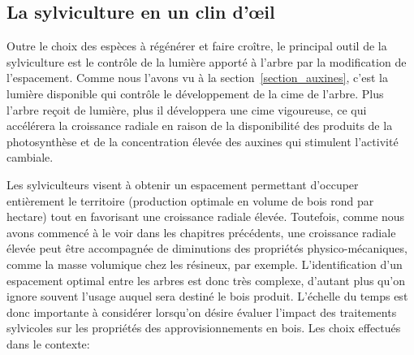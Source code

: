 \subsection{La sylviculture en un clin d'œil}

Outre le choix des espèces à régénérer et faire croître, le principal outil de la sylviculture est le contrôle de la lumière apporté à l'arbre par la modification de l'espacement. Comme nous l'avons vu à la section~\ref{section_auxines}, c'est la lumière disponible qui contrôle le développement de la cime de l'arbre. Plus l'arbre reçoit de lumière, plus il développera une cime vigoureuse, ce qui accélérera la croissance radiale en raison de la disponibilité des produits de la photosynthèse et de la concentration élevée des auxines qui stimulent l'activité cambiale.

Les sylviculteurs visent à obtenir un espacement permettant d'occuper entièrement le territoire (production optimale en volume de bois rond par hectare) tout en favorisant une croissance radiale élevée. Toutefois, comme nous avons commencé à le voir dans les chapitres précédents, une croissance radiale élevée peut être accompagnée de diminutions des propriétés physico-mécaniques, comme la masse volumique chez les résineux, par exemple. L'identification d'un espacement optimal entre les arbres est donc très complexe, d'autant plus qu'on ignore souvent l'usage auquel sera destiné le bois produit. L'échelle du temps est donc importante à considérer lorsqu'on désire évaluer l'impact des traitements sylvicoles sur les propriétés des approvisionnements en bois. Les choix effectués dans le contexte:

